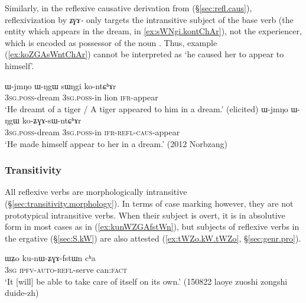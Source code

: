  Similarly, in the reflexive causative derivation  from  (§\ref{sec:refl.caus}), reflexivization by \textit{ʑɣɤ-} only targets the intransitive subject of the base verb (the entity which appears in the dream,  in \ref{ex:sWNgi.kontChAr}), not the experiencer, which is encoded as possessor of the noun . Thus, example (\ref{ex:koZGAsWntChAr}) cannot be interpreted as `he caused her to appear to himself'.
 
\begin{exe}
\ex 
\begin{xlist}
\ex \label{ex:sWNgi.kontChAr}
\gll ɯ-jmŋo ɯ-ŋgɯ sɯŋgi ko-ntɕʰɤr \\
\textsc{3sg}.\textsc{poss}-dream \textsc{3sg}.\textsc{poss}-in lion \textsc{ifr}-appear \\
\glt `He dreamt of a tiger / A tiger appeared to him in a dream.' (elicited)
\ex \label{ex:koZGAsWntChAr}
\gll  ɯ-jmŋo ɯ-ŋgɯ ko-ʑɣɤ-sɯ-ntɕʰɤr    \\
\textsc{3sg}.\textsc{poss}-dream \textsc{3sg}.\textsc{poss}-in \textsc{ifr}-\textsc{refl}-\textsc{caus}-appear  \\
\glt `He made himself appear to her in a dream.' (2012 Norbzang) 
\end{xlist}
 \end{exe}
 
  \subsubsection{Transitivity} \label{sec:refl.erg}
All reflexive verbs are morphologically intransitive (§\ref{sec:transitivity.morphology}). In terms of case marking however, they are not prototypical intransitive verbs. When their subject is overt, it is in absolutive form in most cases as in (\ref{ex:kunWZGAfstWn}), but subjects of reflexive verbs in the ergative (§\ref{sec:S.kW}) are also attested (\ref{ex:tWZo.kW.tWZo}, §\ref{sec:genr.pro}).


\begin{exe}
\ex \label{ex:kunWZGAfstWn}
 \gll ɯʑo ku-nɯ-ʑɣɤ-fstɯn cʰa \\
 \textsc{3sg} \textsc{ipfv}-\textsc{auto}-\textsc{refl}-serve can:\textsc{fact} \\
 \glt `It [will] be able to take care of itself on its own.' (150822 laoye zuoshi zongshi duide-zh) 
 \end{exe}

